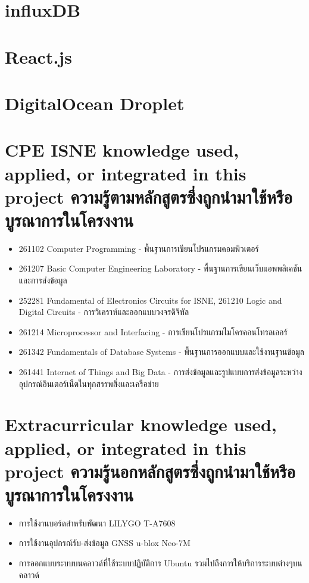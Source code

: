 \section{influxDB}

\section{React.js}

\section{DigitalOcean Droplet}

\section{\ifenglish%
\ifcpe CPE \else ISNE \fi knowledge used, applied, or integrated in this project
\else%
ความรู้ตามหลักสูตรซึ่งถูกนำมาใช้หรือบูรณาการในโครงงาน
\fi
}
\begin{itemize}
  \item 261102 Computer Programming - พื้นฐานการเขียนโปรแกรมคอมพิวเตอร์
  \item 261207 Basic Computer Engineering Laboratory - พื้นฐานการเขียนเว็บแอพพลิเคชันและการส่งข้อมูล
  \item 252281 Fundamental of Electronics Circuits for ISNE, 261210 Logic and Digital Circuits - การวิเคราห์และออกแบบวงจรดิจิทัล
  \item 261214 Microprocessor and Interfacing - การเขียนโปรแกรมไมโครคอนโทรลเลอร์
  \item 261342 Fundamentals of Database Systems - พื้นฐานการออกแบบและใช้งานฐานข้อมูล
  \item 261441 Internet of Things and Big Data - การส่งข้อมูลและรูปแบบการส่งข้อมูลระหว่างอุปกรณ์อินเตอร์เน็ตในทุกสรรพสิ่งและเครือข่าย
\end{itemize}

\section{\ifenglish%
Extracurricular knowledge used, applied, or integrated in this project
\else%
ความรู้นอกหลักสูตรซึ่งถูกนำมาใช้หรือบูรณาการในโครงงาน
\fi
}
\begin{itemize}
  \item การใช้งานบอร์ดสำหรับพัฒนา LILYGO T-A7608
  \item การใช้งานอุปกรณ์รับ-ส่งข้อมูล GNSS u-blox Neo-7M
  \item การออกแบบระบบบนคลาวด์ที่ใช้ระบบปฏิบัติการ Ubuntu รวมไปถึงการให้บริการระบบต่างๆบนคลาวด์
\end{itemize}